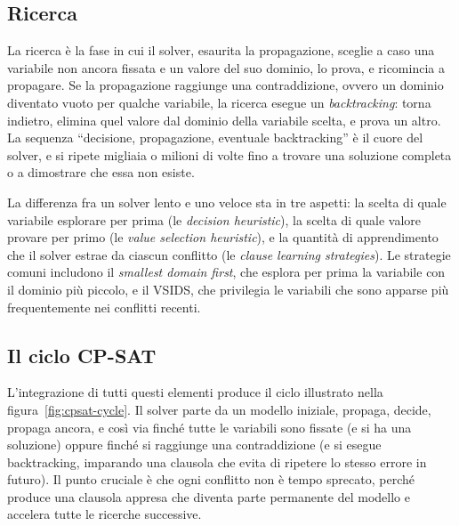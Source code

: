 \subsection{Ricerca}

La ricerca \`e la fase in cui il solver, esaurita la
propagazione, sceglie a caso una variabile non ancora
fissata e un valore del suo dominio, lo prova, e ricomincia
a propagare. Se la propagazione raggiunge una contraddizione,
ovvero un dominio diventato vuoto per qualche variabile, la
ricerca esegue un \emph{backtracking}: torna indietro,
elimina quel valore dal dominio della variabile scelta, e
prova un altro. La sequenza ``decisione, propagazione,
eventuale backtracking'' \`e il cuore del solver, e si
ripete migliaia o milioni di volte fino a trovare una
soluzione completa o a dimostrare che essa non esiste.

La differenza fra un solver lento e uno veloce sta in tre
aspetti: la scelta di quale variabile esplorare per prima
(le \emph{decision heuristic}), la scelta di quale valore
provare per primo (le \emph{value selection heuristic}), e
la quantit\`a di apprendimento che il solver estrae da
ciascun conflitto (le \emph{clause learning strategies}).
Le strategie comuni includono il \emph{smallest domain
first}, che esplora per prima la variabile con il dominio
pi\`u piccolo, e il VSIDS, che privilegia le variabili che
sono apparse pi\`u frequentemente nei conflitti recenti.

\subsection{Il ciclo CP-SAT}

L'integrazione di tutti questi elementi produce il ciclo
illustrato nella figura~\ref{fig:cpsat-cycle}. Il solver
parte da un modello iniziale, propaga, decide, propaga
ancora, e cos\`i via finch\'e tutte le variabili sono
fissate (e si ha una soluzione) oppure finch\'e si raggiunge
una contraddizione (e si esegue backtracking, imparando una
clausola che evita di ripetere lo stesso errore in futuro).
Il punto cruciale \`e che ogni conflitto non \`e tempo
sprecato, perch\'e produce una clausola appresa che diventa
parte permanente del modello e accelera tutte le ricerche
successive.

